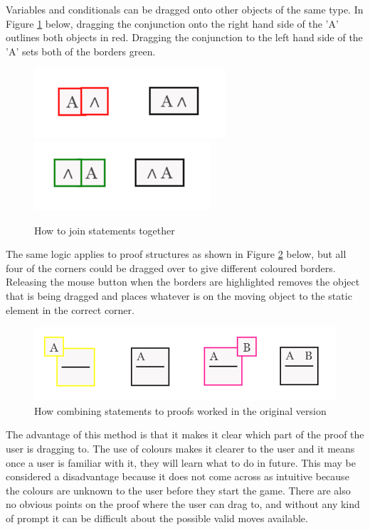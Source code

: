 Variables and conditionals can be dragged onto other objects of the same type. In Figure \ref{fig:Conjunction} below, dragging the conjunction onto the right hand side of the 'A' outlines both objects in red. Dragging the conjunction to the left hand side of the 'A' sets both of the borders green.
 
\begin{figure}[H]
\centering
\includegraphics[scale=0.75]{AConjunction}
\includegraphics[scale=0.75]{ConjunctionA}
\caption{How to join statements together}
 \label{fig:Conjunction}
\end{figure}

The same logic applies to proof structures as shown in Figure \ref{fig:oldColour} below, but all four of the corners could be dragged over to give different coloured borders. Releasing the mouse button when the borders are highlighted removes the object that is being dragged and places whatever is on the moving object to the static element in the correct corner.  

\begin{figure}[H]
\centering
\centerline{\includegraphics[scale=0.7]{oldColour}}
\caption{How combining statements to proofs worked in the original version}
 \label{fig:oldColour}
\end{figure}

The advantage of this method is that it makes it clear which part of the proof the user is dragging to. The use of colours makes it clearer to the user and it means once a user is familiar with it, they will learn what to do in future. This may be considered a disadvantage because it does not come across as intuitive because the colours are unknown to the user before they start the game. There are also no obvious points on the proof where the user can drag to, and without any kind of prompt it can be difficult about the possible valid moves available.

